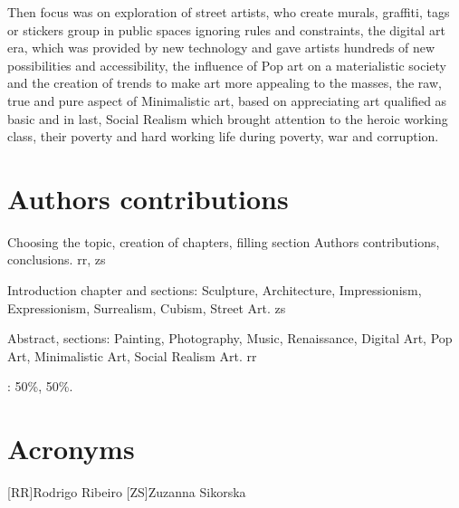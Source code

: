 \documentclass{report}
\begin{document}
Then focus was on exploration of street artists, who create murals, graffiti, tags or stickers group in public spaces ignoring rules and constraints, the digital art era, which was provided by new technology and gave artists hundreds of new possibilities and accessibility, the influence of Pop art on a materialistic society and the creation of trends to make art more appealing to the masses, the raw, true and pure aspect of Minimalistic art, based on appreciating art qualified as basic and in last, Social Realism which brought attention to the heroic working class, their poverty and hard working life during poverty, war and corruption.


\chapter*{Authors contributions}
Choosing the topic, creation of chapters, filling section Authors contributions, conclusions. \ac{rr}, \ac{zs}

Introduction chapter and sections: Sculpture, Architecture, Impressionism, Expressionism, Surrealism, Cubism, Street Art. \ac{zs}

Abstract, sections: Painting, Photography, Music, Renaissance, Digital Art, Pop Art, Minimalistic Art, Social Realism Art. \ac{rr}

\vspace{10pt}

\authors : 50\%, 50\%.\\

\chapter*{Acronyms}
\begin{acronym}
[RR]{Rodrigo Ribeiro}
[ZS]{Zuzanna Sikorska}
\end{acronym}


\printbibliography
\end{document}
